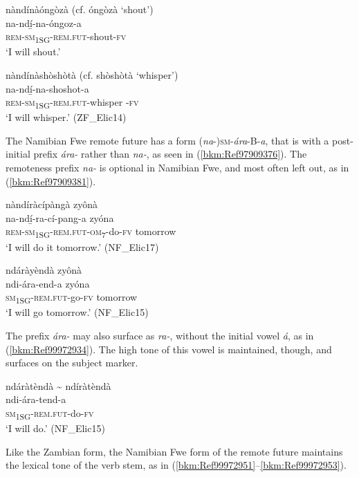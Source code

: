 \ea
\label{bkm:Ref75354891}
nàndínàóngòzà (cf. óngòzà ‘shout’)\\
\gll na-ndí̲-na-óngoz-a\\
\textsc{rem}-\textsc{sm}\textsubscript{1SG}-\textsc{rem}.\textsc{fut}-shout-\textsc{fv}\\
\glt ‘I will shout.’
\z

\ea
\label{bkm:Ref75354892}
nàndínàshòshòtà (cf. shòshòtà ‘whisper’)\\
\gll na-ndí̲-na-shoshot-a\\
\textsc{rem}-\textsc{sm}\textsubscript{1SG}-\textsc{rem}.\textsc{fut}-whisper -\textsc{fv}\\
\glt ‘I will whisper.’ (ZF\_Elic14)
\z

The Namibian Fwe remote future has a form (\textit{na}-)\textsc{sm}-\textit{ára}-B-\textit{a}, that is with a post-initial prefix \textit{ára-} rather than \textit{na-}, as seen in (\ref{bkm:Ref97909376}). The remoteness prefix \textit{na-} is optional in Namibian Fwe, and most often left out, as in (\ref{bkm:Ref97909381}).

\ea
\label{bkm:Ref97909376}
nàndíràcípàngà zyônà\\
\gll na-ndí̲-ra-cí-pang-a    zyóna\\
\textsc{rem}-\textsc{sm}\textsubscript{1SG}-\textsc{rem}.\textsc{fut}-\textsc{om}\textsubscript{7}-do-\textsc{fv}  tomorrow\\
\glt ‘I will do it tomorrow.’ (NF\_Elic17)
\z

\ea
\label{bkm:Ref97909381}
ndáràyèndà zyônà\\
\gll ndi-ára-end-a    zyóna\\
\textsc{sm}\textsubscript{1SG}-\textsc{rem}.\textsc{fut}-go-\textsc{fv}  tomorrow\\
\glt ‘I will go tomorrow.’ (NF\_Elic15)
\z

The prefix \textit{ára-} may also surface as \textit{ra-}, without the initial vowel \textit{á}, as in (\ref{bkm:Ref99972934}). The high tone of this vowel is maintained, though, and surfaces on the subject marker.

\ea
\label{bkm:Ref99972934}
ndáràtèndà {\textasciitilde} ndíràtèndà\\
\gll ndi-ára-tend-a\\
\textsc{sm}\textsubscript{1SG}-\textsc{rem}.\textsc{fut}-do-\textsc{fv}\\
\glt ‘I will do.’ (NF\_Elic15)
\z

Like the Zambian form, the Namibian Fwe form of the remote future maintains the lexical tone of the verb stem, as in (\ref{bkm:Ref99972951}--\ref{bkm:Ref99972953}).

